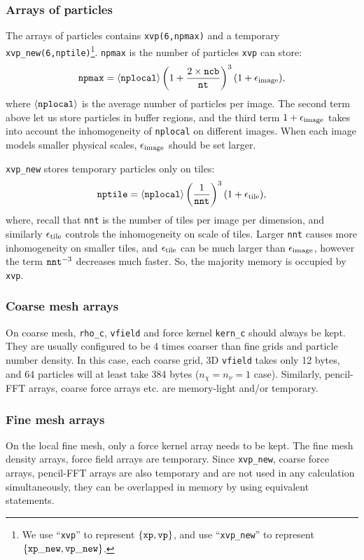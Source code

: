 \documentclass[10pt,twocolumn,preprint]{emulateapj}
\begin{document}
\subsubsection{Arrays of particles}
The arrays of particles contains {\tt xvp(6,npmax)} and a temporary {\tt xvp\_new(6,nptile)}\footnote{We use ``{\tt xvp}'' to represent $\{{\tt xp},{\tt vp}\}$, and use ``{\tt xvp\_new}'' to represent $\{{\tt xp\_new},{\tt vp\_new}\}$.}. {\tt npmax} is the number of particles {\tt xvp} can store:
\begin{equation}\label{eq.npmax}
	{\tt npmax}=\left\langle {\tt nplocal} \right\rangle \left( 1+\frac{2\times {\tt ncb}}{\tt nt} \right)^3(1+\epsilon_{\rm image}),
\end{equation}
where $\left\langle {\tt nplocal} \right\rangle$ is the average number of particles per image. The second term above let us store particles in buffer regions, and the third term $1+\epsilon_{\rm image}$ takes into account the inhomogeneity of {\tt nplocal} on different images. When each image models smaller physical scales, $\epsilon_{\rm image}$ should be set larger. 

{\tt xvp\_new} stores temporary particles only on tiles:
\begin{equation}\label{eq.nptile}
	{\tt nptile}=\left\langle {\tt nplocal} \right\rangle \left( \frac{1}{\tt nnt} \right)^3(1+\epsilon_{\rm tile}),
\end{equation}
where, recall that {\tt nnt} is the number of tiles per image per dimension, and similarly $\epsilon_{\rm tile}$ controls the inhomogeneity on scale of tiles. Larger {\tt nnt} causes more inhomogeneity on smaller tiles, and $\epsilon_{\rm tile}$ can be much larger than $\epsilon_{\rm image}$, however the term ${\tt nnt}^{-3}$ decreases much faster. So, the majority memory is occupied by {\tt xvp}.

\subsubsection{Coarse mesh arrays}
On coarse mesh, {\tt rho\_c}, {\tt vfield} and force kernel {\tt kern\_c} should always be kept. They are usually configured to be 4 times coarser than fine grids and particle number density. In this case, each coarse grid, 3D {\tt vfield} takes only 12 bytes, and 64 particles will at least take 384 bytes ($n_\chi=n_\nu=1$ case). Similarly, pencil-FFT arrays, coarse force arrays etc. are memory-light and/or temporary.

\subsubsection{Fine mesh arrays}
On the local fine mesh, only a force kernel array needs to be kept. The fine mesh density arrays, force field arrays are temporary. Since {\tt xvp\_new}, coarse force arrays, pencil-FFT arrays are also temporary and are not used in any calculation simultaneously, they can be overlapped in memory by using equivalent statements.
\end{document}
